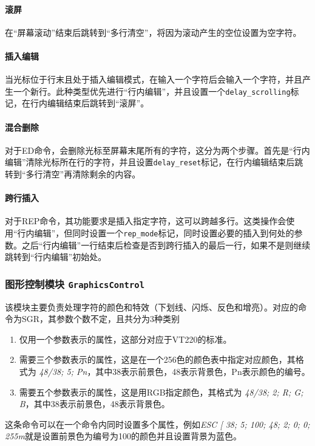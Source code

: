 \paragraph{滚屏}
在``屏幕滚动''结束后跳转到``多行清空''，将因为滚动产生的空位设置为空字符。

\paragraph{插入编辑}
当光标位于行末且处于插入编辑模式，在输入一个字符后会输入一个字符，并且产生一个新行。此种类型优先进行``行内编辑''，并且设置一个\texttt{delay\_scrolling}标记，在行内编辑结束后跳转到``滚屏''。

\paragraph{混合删除}
对于ED命令，会删除光标至屏幕末尾所有的字符，这分为两个步骤。首先是``行内编辑''清除光标所在行的字符，并且设置\texttt{delay\_reset}标记，在行内编辑结束后跳转到``多行清空''再清除剩余的内容。
\paragraph{跨行插入}
对于REP命令，其功能要求是插入指定字符，这可以跨越多行。这类操作会使用``行内编辑''，但同时设置一个\texttt{rep\_mode}标记，同时设置必要的插入到何处的参数。之后``行内编辑''一行结束后检查是否到跨行插入的最后一行，如果不是则继续跳转到``行内编辑''初始处。
\subsubsection{图形控制模块 \texttt{GraphicsControl}}
该模块主要负责处理字符的颜色和特效（下划线、闪烁、反色和增亮）。对应的命令为SGR，其参数个数不定，且共分为3种类别
\begin{enumerate}
	\item 仅用一个参数表示的属性，这部分对应于VT220的标准。
	\item 需要三个参数表示的属性，这是在一个256色的颜色表中指定对应颜色，其格式为 {\it 48/38; 5; Pn}，其中38表示前景色，48表示背景色，Pn表示颜色的编号。
	\item 需要五个参数表示的属性，这是用RGB指定颜色，其格式为 {\it 48/38; 2; R; G; B}，其中38表示前景色，48表示背景色。
\end{enumerate}

这条命令可以在一个命令内同时设置多个属性，例如{\it ESC [ 38; 5; 100; 48; 2; 0; 0; 255m}就是设置前景色为编号为100的颜色并且设置背景为蓝色。

